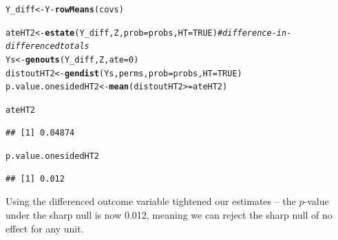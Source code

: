 \documentclass[11pt,notitlepage]{article}\usepackage[]{graphicx}\usepackage[]{color}
\makeatletter
\newcommand{\hlnum}[1]{\textcolor[rgb]{0.686,0.059,0.569}{#1}}%
\newcommand{\hlcom}[1]{\textcolor[rgb]{0.678,0.584,0.686}{\textit{#1}}}%
\newcommand{\hlopt}[1]{\textcolor[rgb]{0,0,0}{#1}}%
\newcommand{\hlstd}[1]{\textcolor[rgb]{0.345,0.345,0.345}{#1}}%
\newcommand{\hlkwb}[1]{\textcolor[rgb]{0.69,0.353,0.396}{#1}}%
\newcommand{\hlkwc}[1]{\textcolor[rgb]{0.333,0.667,0.333}{#1}}%
\newcommand{\hlkwd}[1]{\textcolor[rgb]{0.737,0.353,0.396}{\textbf{#1}}}%
\newenvironment{kframe}{%
 \def\at@end@of@kframe{}%
 \ifinner\ifhmode%
  \def\at@end@of@kframe{\end{minipage}}%
  \begin{minipage}{\columnwidth}%
 \fi\fi%
 \def\FrameCommand##1{\hskip\@totalleftmargin \hskip-\fboxsep
 \colorbox{shadecolor}{##1}\hskip-\fboxsep
     \hskip-\linewidth \hskip-\@totalleftmargin \hskip\columnwidth}%
 \MakeFramed {\advance\hsize-\width
   \@totalleftmargin\z@ \linewidth\hsize
   \@setminipage}}%
 {\par\unskip\endMakeFramed%
 \at@end@of@kframe}
\newenvironment{knitrout}{}{} %
\makeatother
\begin{document}
\begin{enumerate}[a)]
\begin{knitrout}
\color{fgcolor}\begin{kframe}
\begin{alltt}
\hlstd{Y_diff} \hlkwb{<-} \hlstd{Y} \hlopt{-} \hlkwd{rowMeans}\hlstd{(covs)}

\hlstd{ateHT2} \hlkwb{<-} \hlkwd{estate}\hlstd{(Y_diff,Z,}\hlkwc{prob}\hlstd{=probs,}\hlkwc{HT}\hlstd{=}\hlnum{TRUE}\hlstd{)}  \hlcom{# difference-in-differenced totals}
\hlstd{Ys} \hlkwb{<-} \hlkwd{genouts}\hlstd{(Y_diff,Z,}\hlkwc{ate}\hlstd{=}\hlnum{0}\hlstd{)}
\hlstd{distoutHT2} \hlkwb{<-} \hlkwd{gendist}\hlstd{(Ys,perms,}\hlkwc{prob}\hlstd{=probs,}\hlkwc{HT}\hlstd{=}\hlnum{TRUE}\hlstd{)}
\hlstd{p.value.onesidedHT2} \hlkwb{<-} \hlkwd{mean}\hlstd{(distoutHT2} \hlopt{>=} \hlstd{ateHT2)}

\hlstd{ateHT2}
\end{alltt}
\begin{verbatim}
## [1] 0.04874
\end{verbatim}
\begin{alltt}
\hlstd{p.value.onesidedHT2}
\end{alltt}
\begin{verbatim}
## [1] 0.012
\end{verbatim}
\end{kframe}
\end{knitrout}

Using the differenced outcome variable tightened our estimates -- the $p$-value under the sharp null is now 0.012, meaning we can reject the sharp null of no effect for any unit.

\end{enumerate}
\end{document}
